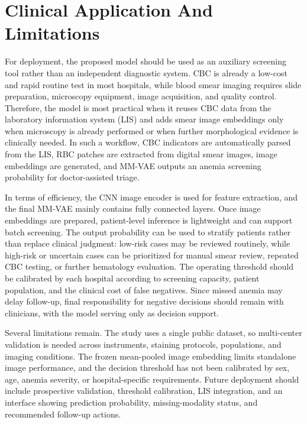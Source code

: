 \documentclass[conference,letterpaper]{IEEEtran}
\begin{document}
\FloatBarrier

\section{Clinical Application And Limitations}

For deployment, the proposed model should be used as an auxiliary screening tool rather than an independent diagnostic system. CBC is already a low-cost and rapid routine test in most hospitals, while blood smear imaging requires slide preparation, microscopy equipment, image acquisition, and quality control. Therefore, the model is most practical when it reuses CBC data from the laboratory information system (LIS) and adds smear image embeddings only when microscopy is already performed or when further morphological evidence is clinically needed. In such a workflow, CBC indicators are automatically parsed from the LIS, RBC patches are extracted from digital smear images, image embeddings are generated, and MM-VAE outputs an anemia screening probability for doctor-assisted triage.

In terms of efficiency, the CNN image encoder is used for feature extraction, and the final MM-VAE mainly contains fully connected layers. Once image embeddings are prepared, patient-level inference is lightweight and can support batch screening. The output probability can be used to stratify patients rather than replace clinical judgment: low-risk cases may be reviewed routinely, while high-risk or uncertain cases can be prioritized for manual smear review, repeated CBC testing, or further hematology evaluation. The operating threshold should be calibrated by each hospital according to screening capacity, patient population, and the clinical cost of false negatives. Since missed anemia may delay follow-up, final responsibility for negative decisions should remain with clinicians, with the model serving only as decision support.

Several limitations remain. The study uses a single public dataset, so multi-center validation is needed across instruments, staining protocols, populations, and imaging conditions. The frozen mean-pooled image embedding limits standalone image performance, and the decision threshold has not been calibrated by sex, age, anemia severity, or hospital-specific requirements. Future deployment should include prospective validation, threshold calibration, LIS integration, and an interface showing prediction probability, missing-modality status, and recommended follow-up actions.
\end{document}
